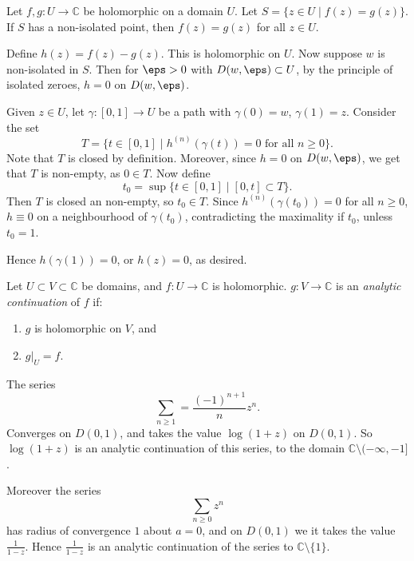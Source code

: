 \documentclass[12pt]{article}
\begin{document}
\begin{proposition}
	Let $f, g : U \to \mathbb{C}$ be holomorphic on a domain $U$. Let $S = \{z \in U \mid f(z) = g(z)\}$. If $S$ has a non-isolated point, then $f(z) = g(z)$ for all $z \in U$.
\end{proposition}

\begin{proofbox}
	Define $h(z) = f(z) - g(z)$. This is holomorphic on $U$. Now suppose $w$ is non-isolated in $S$. Then for $\eps > 0$ with $D(w, \eps) \subset U$, by the principle of isolated zeroes, $h = 0$ on $D(w, \eps)$.

	Given $z \in U$, let $\gamma : [0, 1] \to U$ be a path with $\gamma(0) = w$, $\gamma(1) = z$. Consider the set
	\[
		T = \{t \in [0, 1] \mid h^{(n)}(\gamma(t)) = 0 \text{ for all } n \geq 0\}
	.\]
	Note that $T$ is closed by definition. Moreover, since $h = 0$ on $D(w, \eps)$, we get that $T$ is non-empty, as $0 \in T$. Now define
	\[
		t_0 = \sup\{t \in [0, 1] \mid [0,t] \subset T\}
	.\]
	Then $T$ is closed an non-empty, so $t_0 \in T$. Since $h^{(n)}(\gamma(t_0)) = 0$ for all $n \geq 0$, $h \equiv 0$ on a neighbourhood of $\gamma(t_0)$, contradicting the maximality if $t_0$, unless $t_0 = 1$.

	Hence $h(\gamma(1)) = 0$, or $h(z) = 0$, as desired.
\end{proofbox}

\begin{definition}
	Let $U \subset V \subset \mathbb{C}$ be domains, and $f : U \to \mathbb{C}$ is holomorphic. $g : V \to \mathbb{C}$ is an \emph{analytic continuation} of $f$ if:
	\begin{enumerate}
		\item $g$ is holomorphic on $V$, and
		\item $g|_U = f$.
	\end{enumerate}
\end{definition}

\begin{exbox}
	The series
	\[
	\sum_{n \geq 1} = \frac{(-1)^{n+1}}{n} z^{n}
	.\]
	Converges on $D(0, 1)$, and takes the value $\log(1+z)$ on $D(0, 1)$. So $\log(1+z)$ is an analytic continuation of this series, to the domain $\mathbb{C} \setminus (-\infty, -1]$.

	Moreover the series
	\[
	\sum_{n \geq 0} z^{n}
	\]
	has radius of convergence $1$ about $a = 0$, and on $D(0, 1)$ we it takes the value $\frac{1}{1-z}$. Hence $\frac{1}{1-z}$ is an analytic continuation of the series to $\mathbb{C}\setminus\{1\}$.
\end{exbox}
\end{document}
